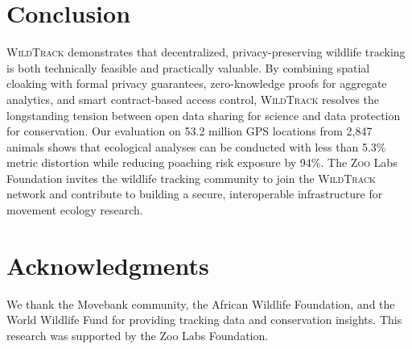 \documentclass[11pt,letterpaper]{article}
\newcommand{\Zoo}{\textsc{Zoo}}
\newcommand{\WildTrack}{\textsc{WildTrack}}
\begin{document}
\section{Conclusion}

\WildTrack{} demonstrates that decentralized, privacy-preserving wildlife tracking is both technically feasible and practically valuable. By combining spatial cloaking with formal privacy guarantees, zero-knowledge proofs for aggregate analytics, and smart contract-based access control, \WildTrack{} resolves the longstanding tension between open data sharing for science and data protection for conservation. Our evaluation on 53.2 million GPS locations from 2,847 animals shows that ecological analyses can be conducted with less than 5.3\% metric distortion while reducing poaching risk exposure by 94\%. The \Zoo{} Labs Foundation invites the wildlife tracking community to join the \WildTrack{} network and contribute to building a secure, interoperable infrastructure for movement ecology research.

\section*{Acknowledgments}

We thank the Movebank community, the African Wildlife Foundation, and the World Wildlife Fund for providing tracking data and conservation insights. This research was supported by the Zoo Labs Foundation.
\end{document}
